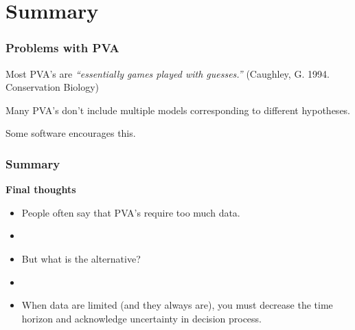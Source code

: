 \documentclass[color=usenames,dvipsnames]{beamer}\usepackage[]{graphicx}\usepackage[]{color}
\begin{document}
\section{Summary}



\begin{frame}
  \frametitle{Problems with PVA}
  \large
  Most PVA's are {\it ``essentially games played with
    guesses.''} (Caughley, G. 1994. Conservation Biology) \par
  \pause
  \vspace{0.5cm}
  Many PVA's don't include multiple models corresponding to different
  hypotheses. \par
  \pause
  \vspace{0.5cm}
  {Some software encourages this. \\}
\end{frame}




\begin{frame}
  \frametitle{Summary}
  \large
  {\bf Final thoughts}
  \begin{itemize}[<+->]
    \item People often say that PVA's require too much data.
    \item[]
    \item But what is the alternative?
    \item[]
    \item When data are limited (and they always are), you must
      decrease the time horizon and acknowledge uncertainty in decision process. 
  \end{itemize}
\end{frame}
\end{document}
